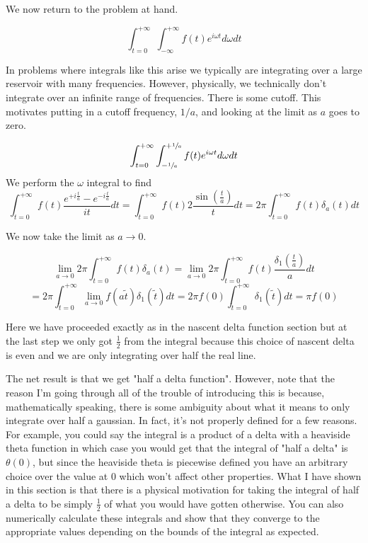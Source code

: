 \documentclass[12pt]{article}
\begin{document}
We now return to the problem at hand.

\[
\int_{t=0}^{+\infty}\int_{-\infty}^{+\infty} f(t) e^{i \omega t} d\omega dt
\]

In problems where integrals like this arise we typically are integrating over a large reservoir with many frequencies. However, physically, we technically don't integrate over an infinite range of frequencies. There is some cutoff. This motivates putting in a cutoff frequency, $1/a$, and looking at the limit as $a$ goes to zero.

\[
\int_{t=0}^{+\infty}\int_{-\sfrac{1}{a}}^{+\sfrac{1}{a}} f(t) e^{i \omega t} d\omega dt
\]
We perform the $\omega$ integral to find
\[
\int_{t=0}^{+\infty}f(t) \frac{e^{+i \frac{t}{a}} - e^{-i \frac{t}{a}}}{i t} dt 
=\int_{t=0}^{+\infty}f(t) 2\frac{\sin\left(\frac{t}{a}\right)}{t} dt
= 2\pi \int_{t=0}^{+\infty}f(t) \delta_a(t) dt
\]

We now take the limit as $a\rightarrow 0$.

\[
\lim_{a\rightarrow 0} 2\pi \int_{t=0}^{+\infty} f(t) \delta_a(t) 
=\lim_{a\rightarrow 0} 2\pi \int_{t=0}^{+\infty} f(t) \frac{\delta_1\left(\frac{t}{a}\right)}{a} dt
\]
\[
= 2\pi \int_{\tilde{t}=0}^{+\infty} \lim_{a\rightarrow 0}f(a \tilde{t}) \delta_1(\tilde{t}) dt = 2\pi f(0)\int_{\tilde{t}=0}^{+\infty} \delta_1(\tilde{t}) dt = \pi f(0)
\]

Here we have proceeded exactly as in the nascent delta function section but at the last step we only got $\frac{1}{2}$ from the integral because this choice of nascent delta is even and we are only integrating over half the real line.

The net result is that we get "half a delta function". However, note that the reason I'm going through all of the trouble of introducing this is because, mathematically speaking, there is some ambiguity about what it means to only integrate over half a gaussian. In fact, it's not properly defined for a few reasons. For example, you could say the integral is a product of a delta with a heaviside theta function in which case you would get that the integral of "half a delta" is $\theta(0)$, but since the heaviside theta is piecewise defined you have an arbitrary choice over the value at 0 which won't affect other properties. What I have shown in this section is that there is a physical motivation for taking the integral of half a delta to be simply $\frac{1}{2}$ of what you would have gotten otherwise. You can also numerically calculate these integrals and show that they converge to the appropriate values depending on the bounds of the integral as expected.
\end{document}
